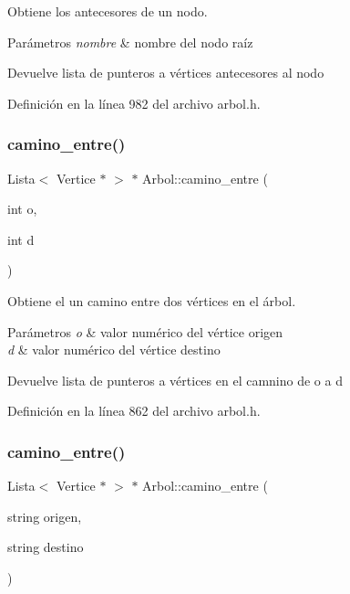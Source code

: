 Obtiene los antecesores de un nodo. 


\begin{DoxyParams}{Parámetros}
{\em nombre} & nombre del nodo raíz \\
\hline
\end{DoxyParams}
\begin{DoxyReturn}{Devuelve}
lista de punteros a vértices antecesores al nodo 
\end{DoxyReturn}


Definición en la línea 982 del archivo arbol.\+h.

\mbox{\label{classArbol_accfa606c5f5e67b6ab18c4490075cf39}} 
\subsubsection{\texorpdfstring{camino\+\_\+entre()}{camino\_entre()}\hspace{0.1cm}{\footnotesize\ttfamily [1/2]}}
{\footnotesize\ttfamily Lista$<$ Vertice $\ast$ $>$ $\ast$ Arbol\+::camino\+\_\+entre (\begin{DoxyParamCaption}\item[{int}]{o,  }\item[{int}]{d }\end{DoxyParamCaption})}



Obtiene el un camino entre dos vértices en el árbol. 


\begin{DoxyParams}{Parámetros}
{\em o} & valor numérico del vértice origen \\
\hline
{\em d} & valor numérico del vértice destino \\
\hline
\end{DoxyParams}
\begin{DoxyReturn}{Devuelve}
lista de punteros a vértices en el camnino de o a d 
\end{DoxyReturn}


Definición en la línea 862 del archivo arbol.\+h.

\mbox{\label{classArbol_aef0f680828ac573af495b98d2eb09c12}} 
\subsubsection{\texorpdfstring{camino\+\_\+entre()}{camino\_entre()}\hspace{0.1cm}{\footnotesize\ttfamily [2/2]}}
{\footnotesize\ttfamily Lista$<$ Vertice $\ast$ $>$ $\ast$ Arbol\+::camino\+\_\+entre (\begin{DoxyParamCaption}\item[{string}]{origen,  }\item[{string}]{destino }\end{DoxyParamCaption})}



